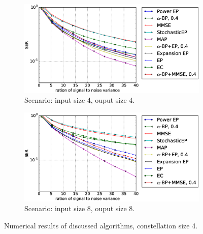 \documentclass{article}
\begin{document}
\begin{figure}[!t]
  \begin{subfigure}{1\textwidth}
    \captionsetup[subfigure]{justification=centering}
    \centering
    \includegraphics[width=1\linewidth]{figures/ep_experiments4by4_qpsk_alpha4_.eps}
    \caption{Scenario: input size 4, ouput size 4.}
    \label{fig:compare-const4-44}
  \end{subfigure}
  \begin{subfigure}{1\textwidth}
    \includegraphics[width=1\linewidth]{figures/ep_experiments8by8_qpsk_alpha4_.eps}
    \caption{Scenario: input size 8, ouput size 8.}
    \label{fig:compare-const4-88}
  \end{subfigure}
  \caption{Numerical results of discussed algorithms, constellation
    size 4.}
  \label{fig:compare-const4}
\end{figure}
\end{document}
